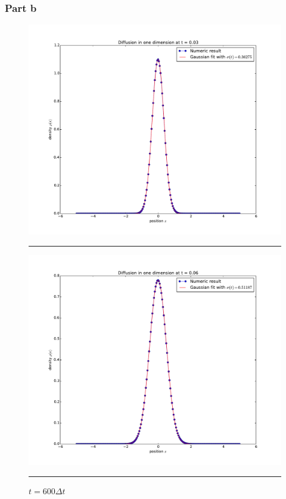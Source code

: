 \documentclass[notitlepage,aps,prd,nofootinbib]{revtex4-1}
\begin{document}
\newpage
\subsubsection{Part b}
\label{subsubsec:results_2_b}
\begin{figure}[!htbc]
  \centering
  \includegraphics[width=.6\textwidth]{../output/plots_for_paper/part_b_300.pdf}
  	{\par\nobreak\rule[9pt]{35em}{0.5pt}\vspace{-5mm}}
	\caption{$t = 300\Delta t$}
	\label{fig:part_b_1}
  \includegraphics[width=.6\textwidth]{../output/plots_for_paper/part_b_600.pdf}
  	{\par\nobreak\rule[9pt]{35em}{0.5pt}\vspace{-5mm}}
	\caption{$t = 600\Delta t$}
	\label{fig:part_b_2}
\end{figure}
\end{document}
